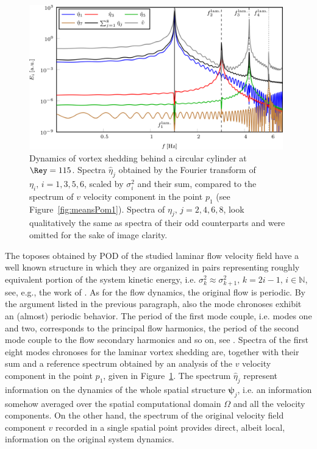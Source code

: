 \begin{figure}[htbp]
    \centering
    \includegraphics[width=0.98\textwidth]{02_images/00_export/figure26.png}
    \caption{Dynamics of vortex shedding behind a circular cylinder at $\Rey = 115$. Spectra $\hat{\eta}_{j}$ obtained by the Fourier transform of $\eta_{i},\,i=1,3,5,6$, scaled by $\sigma_{i}^{2}$ and their sum, compared to the spectrum of $v$ velocity component in the point $p_{1}$ (see Figure~\ref{fig:meansPom1}). Spectra of $\eta_{j},\,j=2,4,6,8$, look qualitatively the same as spectra of their odd counterparts and were omitted for the sake of image clarity.}
    \label{fig:lamVKStreetSpectra}
\end{figure}

The toposes obtained by POD of the studied laminar flow velocity field have a well known structure in which they are organized in pairs representing roughly equivalent portion of the system kinetic energy, i.e. $\sigma_{k}^{2}\approx \sigma_{k+1}^{2},\,k = 2i-1,\,i\in\mathbb{N}$, see, e.g., the work of \citet{taira2020}. As for the flow dynamics, the original flow is periodic. By the argument listed in the previous paragraph, also the mode chronoses exhibit an (almost) periodic behavior. The period of the first mode couple, i.e. modes one and two, corresponds to the principal flow harmonics, the period of the second mode couple to the flow secondary harmonics and so on, see \citep{isoz2018}. Spectra of the first eight modes chronoses for the laminar vortex shedding are, together with their sum and a reference spectrum obtained by an analysis of the $v$ velocity component in the point $p_{1}$, given in Figure~\ref{fig:lamVKStreetSpectra}. The spectrum $\hat{\eta}_{j}$ represent information on the dynamics of the whole spatial structure $\bm{\psi}_{j}$, i.e. an information somehow averaged over the spatial computational domain $\Omega$ and all the velocity components. On the other hand, the spectrum of the original velocity field component $v$ recorded in a single spatial point provides direct, albeit local, information on the original system dynamics.

